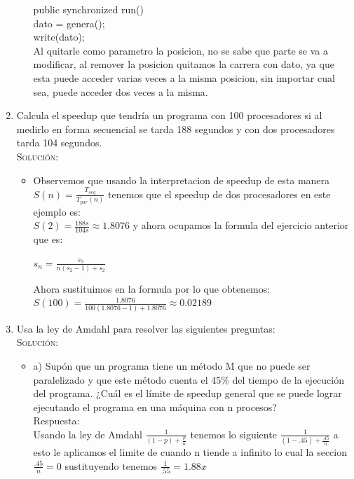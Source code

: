 \documentclass[letterpaper,10pt]{article}
\begin{document}
\begin{enumerate}
\begin{itemize}
	public synchronized run() \\
	dato = genera();\\
	write(dato);\\
	
	Al quitarle como parametro la posicion, no se sabe que parte se va a  modificar, al remover la posicion quitamos la carrera con dato, ya que esta puede acceder varias veces a la misma posicion, sin importar cual sea, puede acceder dos veces a la misma. \\
	
	\end{itemize}
    \item Calcula el speedup que tendría un programa con 100 procesadores si al medirlo en forma secuencial se tarda 188 segundos y con dos procesadores tarda 104 segundos.\\

    \textsc{Solución:}
	\\
	\begin{itemize}
	\item Observemos que usando la interpretacion de speedup de esta manera
	 $S(n)=\frac{T_{seq}}{T_{par}(n)}$
	tenemos que el speedup de dos procesadores en este ejemplo es:\\ 
	$S(2) = \frac{188s}{104s} \approx 1.8076$ y ahora ocupamos la formula del ejercicio anterior que es: 
	\begin{center}
	$s_{n}=\frac{s_{2}}{n(s_{2}-1)+s_{2}}$ \\
	\end{center}
	Ahora sustituimos en la formula por lo que obtenemos:\\
	$S(100) =\frac{1.8076}{100(1.8076-1)+1.8076}\approx 0.02189$ 
	\end{itemize}
	
    \item Usa la ley de Amdahl para resolver las siguientes preguntas:\\
    \textsc{Solución:}
	\\
	\begin{itemize}
	\item a) Supón que un programa tiene un método M que no puede ser paralelizado y que este método cuenta el 45\% del tiempo de la ejecución del programa. ¿Cuál es el límite de speedup general que se puede lograr ejecutando el programa en una máquina con n procesos?\\
	
	Respuesta:\\ Usando la ley de Amdahl $\frac{1}{(1-p)+\frac{p}{n}}$ tenemos lo siguiente $\frac{1}{(1-.45)+\frac{.45}{n}}$ a esto le aplicamos el limite de cuando n tiende a infinito lo cual la seccion $\frac{.45}{n} = 0$ sustituyendo tenemos $\frac{1}{.55} = 1.88x$ \\


\end{itemize}
\end{enumerate}
\end{document}
